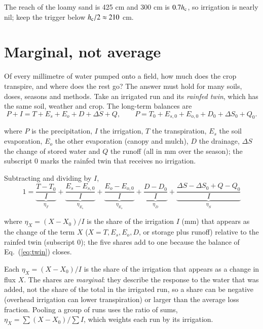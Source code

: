 \sol  The reach of the loamy sand is 425 cm and 300 cm is $0.7h_{\mathrm c}$, so irrigation is nearly nil; keep the trigger below $h_{\mathrm c}/2\approx210$ cm.
\label{ch:fate}
\section{Marginal, not average}
Of every millimetre of water pumped onto a field, how much does the crop transpire, and where does the rest go? The answer must hold for many soils, doses, seasons and methods. Take an irrigated run and its \emph{rainfed twin}, which has the same soil, weather and crop. The long-term balances are
\begin{equation}\label{eq:twin}\boxed{P+I=T+E_s+E_o+D+\Delta S+Q,\qquad P=T_0+E_{s,0}+E_{o,0}+D_0+\Delta S_0+Q_0 .}\end{equation}
\par\noindent where $P$ is the precipitation, $I$ the irrigation, $T$ the transpiration, $E_s$ the soil evaporation, $E_o$ the other evaporation (canopy and mulch), $D$ the drainage, $\Delta S$ the change of stored water and $Q$ the runoff (all in mm over the season); the subscript 0 marks the rainfed twin that receives no irrigation. \finans

Subtracting and dividing by $I$,
\begin{equation}\label{eq:fate}
\boxed{\;1=\underbrace{\frac{T-T_0}{I}}_{\eta_T}+\underbrace{\frac{E_s-E_{s,0}}{I}}_{\eta_{E_s}}+\underbrace{\frac{E_o-E_{o,0}}{I}}_{\eta_{E_o}}+\underbrace{\frac{D-D_0}{I}}_{\eta_D}+\underbrace{\frac{\Delta S-\Delta S_0+Q-Q_0}{I}}_{\eta_S}\;}
\end{equation}
\par\noindent where $\eta_X=(X-X_0)/I$ is the share of the irrigation $I$ (mm) that appears as the change of the term $X$ ($X=T,E_s,E_o,D$, or storage plus runoff) relative to the rainfed twin (subscript 0); the five shares add to one because the balance of Eq.~(\ref{eq:twin}) closes.

Each $\eta_X=(X-X_0)/I$ is the share of the irrigation that appears as a change in flux $X$. The shares are \emph{marginal}: they describe the response to the water that was added, not the share of the total in the irrigated run, so a share can be negative (overhead irrigation can lower transpiration) or larger than the average loss fraction. Pooling a group of runs uses the ratio of sums, $\eta_X=\sum(X-X_0)/\sum I$, which weights each run by its irrigation.

